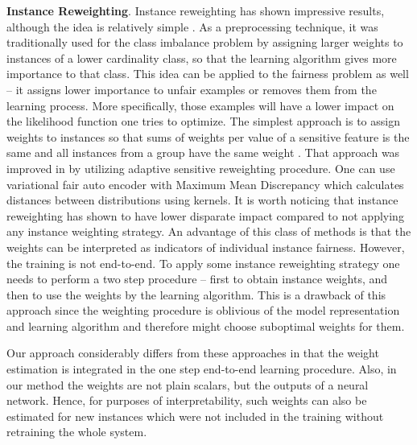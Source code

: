 \documentclass[preprint,12pt]{elsarticle}
\begin{document}
\textbf{Instance Reweighting}. Instance reweighting has shown impressive results, although the idea is relatively simple \cite{feldman2015certifying, krasanakis2018adaptive, ren2018learning, shu2019meta, jiang2018mentornet}. As a preprocessing technique, it was traditionally used for the class imbalance problem by assigning larger weights to instances of a  lower cardinality class, so that the learning algorithm gives more importance to that class. This idea can be applied to the fairness problem as well -- it assigns lower importance to unfair examples or removes them from the learning process. More specifically, those examples will have a lower impact on the likelihood function one tries to optimize.
The simplest approach is to assign weights to instances so that sums of weights per value of a  sensitive feature is the same and all instances from a group have the same weight \cite{kamiran2012data}. That approach was improved in \cite{krasanakis2018adaptive} by utilizing adaptive sensitive reweighting procedure. One can use variational fair auto encoder with Maximum Mean Discrepancy \cite{louizos2015variational} which calculates distances between distributions using kernels. It is worth noticing that instance reweighting has shown to have lower disparate impact \cite{feldman2015certifying} compared to not applying any instance weighting strategy. An advantage of this class of methods is that the weights can be interpreted as indicators of individual instance fairness. However, the training is not end-to-end. To apply some instance reweighting strategy one needs to perform a two step procedure -- first to obtain instance weights, and then to use the weights by the learning algorithm. This is a drawback of this approach since the weighting procedure is oblivious of the model representation and learning algorithm and therefore might choose suboptimal weights for them. 

Our approach considerably differs from these approaches in that the weight estimation is integrated in the one step end-to-end learning procedure. Also, in our method the weights are not plain scalars, but the outputs of a neural network. Hence, for purposes of interpretability, such weights can also be estimated for new instances which were not included in the training without retraining the whole system.
\end{document}
